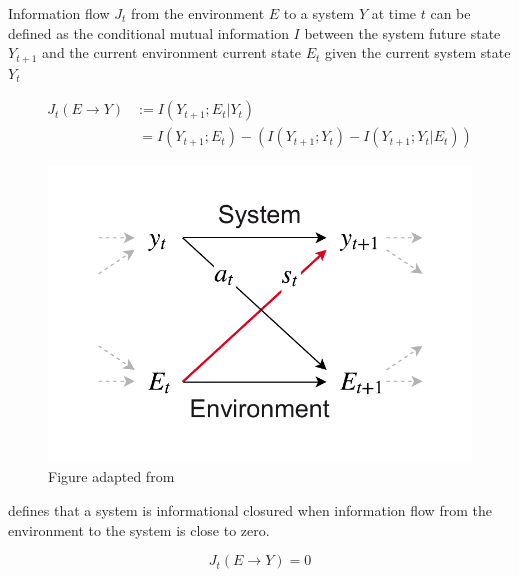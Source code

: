 \documentclass[utf8]{article}
\begin{document}
	
			\noindent
			Information flow $J_{t}$ from the environment $E$ to a system $Y$ at time $t$ can be defined as the conditional mutual information $I$ between the system future state $Y_{t+1}$ and the current environment current state $E_{t}$ given the current system state $Y_{t}$
				
				\begin{equation}\label{eq:InformationFlow}
				\left.\begin{array}
				{rl}{J_{t}(E \rightarrow Y )} & {:= I(Y_{t+1};E_{t}|Y_{t})} \\
				{ } & { \ = I(Y_{t+1};E_{t}) - (I(Y_{t+1};Y_{t})-I(Y_{t+1};Y_{t}|E_{t}))}
				\end{array}\right.
				\end{equation}
		
				\begin{figure}
					\includegraphics[width=\textwidth]{WritingMaterials/SystemAndEnv.pdf} 
					\caption{Figure adapted from \cite{BERTSCHINGER.2006}}
					\label{fig:SystemAndEnv}	
				\end{figure}
		
			
			\noindent
			\cite{BERTSCHINGER.2006} defines that a system is informational closured when information flow from the environment to the system is close to zero.
		
				\begin{equation}
				J_{t}(E \rightarrow Y )=0
				\end{equation}
\end{document}
